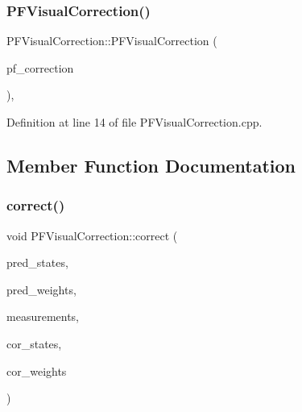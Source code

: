 \mbox{\label{classbfl_1_1PFVisualCorrection_ab20c769ebe03ff70324df73cb194e2db}} 
\subsubsection{\texorpdfstring{P\+F\+Visual\+Correction()}{PFVisualCorrection()}\hspace{0.1cm}{\footnotesize\ttfamily [2/2]}}
{\footnotesize\ttfamily P\+F\+Visual\+Correction\+::\+P\+F\+Visual\+Correction (\begin{DoxyParamCaption}\item[{\mbox{\hyperlink{classbfl_1_1PFVisualCorrection}{P\+F\+Visual\+Correction}} \&\&}]{pf\+\_\+correction }\end{DoxyParamCaption})\hspace{0.3cm}{\ttfamily [protected]}, {\ttfamily [noexcept]}}



Definition at line 14 of file P\+F\+Visual\+Correction.\+cpp.



\subsection{Member Function Documentation}
\mbox{\label{classbfl_1_1PFVisualCorrection_a85b68264ccaf46d5e68f8ea9c93d82cd}} 
\subsubsection{\texorpdfstring{correct()}{correct()}}
{\footnotesize\ttfamily void P\+F\+Visual\+Correction\+::correct (\begin{DoxyParamCaption}\item[{const Eigen\+::\+Ref$<$ const Eigen\+::\+Matrix\+Xf $>$ \&}]{pred\+\_\+states,  }\item[{const Eigen\+::\+Ref$<$ const Eigen\+::\+Vector\+Xf $>$ \&}]{pred\+\_\+weights,  }\item[{cv\+::\+Input\+Array}]{measurements,  }\item[{Eigen\+::\+Ref$<$ Eigen\+::\+Matrix\+Xf $>$}]{cor\+\_\+states,  }\item[{Eigen\+::\+Ref$<$ Eigen\+::\+Vector\+Xf $>$}]{cor\+\_\+weights }\end{DoxyParamCaption})}



